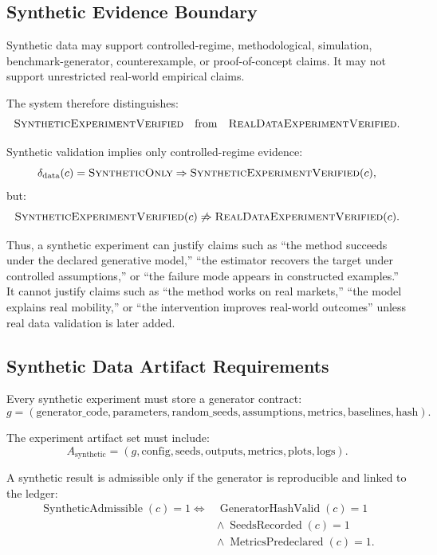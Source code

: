 \documentclass[11pt]{article}
\begin{document}
\subsection{Synthetic Evidence Boundary}

Synthetic data may support controlled-regime, methodological, simulation, benchmark-generator, counterexample, or proof-of-concept claims. It may not support unrestricted real-world empirical claims.

The system therefore distinguishes:
$$
\textsc{SyntheticExperimentVerified}
\quad\text{from}\quad
\textsc{RealDataExperimentVerified}.
$$

Synthetic validation implies only controlled-regime evidence:
$$
\delta_{\text{data}}(c)=\textsc{SyntheticOnly}
\Rightarrow
\textsc{SyntheticExperimentVerified}(c),
$$
but:
$$
\textsc{SyntheticExperimentVerified}(c)
\not\Rightarrow
\textsc{RealDataExperimentVerified}(c).
$$

Thus, a synthetic experiment can justify claims such as ``the method succeeds under the declared generative model,'' ``the estimator recovers the target under controlled assumptions,'' or ``the failure mode appears in constructed examples.'' It cannot justify claims such as ``the method works on real markets,'' ``the model explains real mobility,'' or ``the intervention improves real-world outcomes'' unless real data validation is later added.

\subsection{Synthetic Data Artifact Requirements}

Every synthetic experiment must store a generator contract:
$$
g=(\text{generator\_code},\text{parameters},\text{random\_seeds},\text{assumptions},\text{metrics},\text{baselines},\text{hash}).
$$

The experiment artifact set must include:
$$
A_{\text{synthetic}}=(g,\text{config},\text{seeds},\text{outputs},\text{metrics},\text{plots},\text{logs}).
$$

A synthetic result is admissible only if the generator is reproducible and linked to the ledger:
$$
\begin{aligned}
\operatorname{SyntheticAdmissible}(c)=1
\Longleftrightarrow
&\operatorname{GeneratorHashValid}(c)=1 \\
&\wedge\ \operatorname{SeedsRecorded}(c)=1 \\
&\wedge\ \operatorname{MetricsPredeclared}(c)=1.
\end{aligned}
$$
\end{document}
